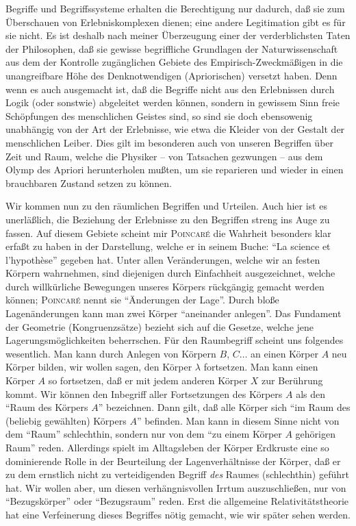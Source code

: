 
Begriffe und Begriffssysteme erhalten die Berechtigung nur dadurch, daß sie zum 
Überschauen von Erlebniskomplexen dienen; eine andere Legitimation gibt es für 
sie nicht. Es ist deshalb nach meiner Überzeugung einer der verderblichsten 
Taten der Philosophen, daß sie gewisse begriffliche Grundlagen der 
Naturwissenschaft aus dem der Kontrolle zugänglichen Gebiete des 
Empirisch-Zweckmäßigen in die unangreifbare Höhe des Denknotwendigen 
(Apriorischen) versetzt haben. Denn wenn es auch ausgemacht ist, daß die 
Begriffe nicht aus den Erlebnissen durch Logik (oder sonstwie) abgeleitet werden 
können, sondern in gewissem Sinn freie Schöpfungen des menschlichen Geistes 
sind, so sind sie doch ebensowenig unabhängig von der Art der Erlebnisse, wie 
etwa die Kleider von der Gestalt der menschlichen Leiber. Dies gilt im 
besonderen auch von unseren Begriffen über Zeit und Raum, welche die Physiker -- 
von Tatsachen gezwungen -- aus dem Olymp des Apriori herunterholen mußten, um 
sie reparieren und wieder in einen brauchbaren Zustand setzen zu können.

Wir kommen nun zu den räumlichen Begriffen und Urteilen. Auch hier ist es 
unerläßlich, die Beziehung der Erlebnisse zu den Begriffen streng ins Auge zu 
fassen. Auf diesem Gebiete scheint mir 
\textsc{Poincar\'e} die Wahrheit besonders klar 
erfaßt zu haben in der Darstellung, welche er in seinem Buche: \enquote{La 
science et l'hypothèse} gegeben hat. Unter allen Veränderungen, welche wir an 
festen Körpern wahrnehmen, sind diejenigen durch Einfachheit ausgezeichnet, 
welche durch willkürliche Bewegungen unseres Körpers rückgängig gemacht werden 
können; \textsc{Poincar\'e} nennt sie 
\enquote{Änderungen der Lage}. Durch bloße Lagenänderungen kann man zwei Körper 
\enquote{aneinander anlegen}. Das Fundament der Geometrie (Kongruenzsätze) 
bezieht sich auf die Gesetze, welche jene Lagerungsmöglichkeiten beherrschen. 
Für den Raumbegriff scheint uns folgendes wesentlich. Man kann durch Anlegen von 
Körpern $B$, $C \ldots$ an einen Körper $A$ neu Körper bilden, wir wollen sagen, 
den Körper $\lambda$ fortsetzen. Man kann einen Körper $A$ so fortsetzen, daß er mit 
jedem anderen Körper $X$ zur Berührung kommt. Wir können den Inbegriff aller 
Fortsetzungen des Körpers $A$ als den \enquote{Raum des Körpers $A$} bezeichnen. 
Dann gilt, daß alle Körper sich \enquote{im Raum des (beliebig gewählten) 
Körpers $A$} befinden. Man kann in diesem Sinne nicht von dem \enquote{Raum} 
schlechthin, sondern nur von dem \enquote{zu einem Körper $A$ gehörigen Raum} 
reden. Allerdings spielt im Alltagsleben der Körper Erdkruste eine so 
dominierende Rolle in der Beurteilung der Lagenverhältnisse der Körper, daß er 
zu dem ernstlich nicht zu verteidigenden Begriff \emph{des} Raumes (schlechthin) 
geführt hat. Wir wollen aber, um diesen verhängnisvollen Irrtum auszuschließen, 
nur von \enquote{Bezugskörper} oder \enquote{Bezugsraum} reden. Erst die 
allgemeine Relativitätstheorie hat eine Verfeinerung dieses Begriffes nötig 
gemacht, wie wir später sehen werden.

